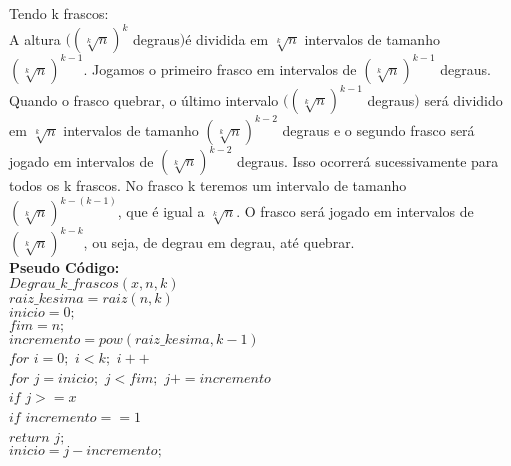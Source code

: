 \documentclass[10pt,a4paper]{article}
\begin{document}
Tendo k frascos:\\

 \hspace{1cm} A altura $((\sqrt[k]{n})^{k}$ degraus$)$é dividida em $\sqrt[k]{n}$ intervalos de tamanho $(\sqrt[k]{n})^{k-1}$. Jogamos o primeiro frasco em intervalos de $(\sqrt[k]{n})^{k-1}$ degraus. Quando o frasco quebrar, o último intervalo $((\sqrt[k]{n})^{k-1}$ degraus$)$ será dividido em $\sqrt[k]{n}$ intervalos de tamanho $(\sqrt[k]{n})^{k-2}$ degraus e o segundo frasco será jogado em intervalos de $(\sqrt[k]{n})^{k-2}$ degraus. Isso ocorrerá sucessivamente para todos os k frascos. No frasco k teremos um intervalo de tamanho $(\sqrt[k]{n})^{k-(k-1)}$, que é igual a $\sqrt[k]{n}$. O frasco será jogado em intervalos de $(\sqrt[k]{n})^{k-k}$, ou seja, de degrau em degrau, até quebrar.\\ 

 
\textbf{Pseudo Código: }\\


	$Degrau\_k\_frascos(x,n,k)$\\
	
	\hspace{1cm}$raiz\_kesima = raiz(n,k)$\\
	
	\hspace{1cm}$inicio = 0;$\\
	
	\hspace{1cm}$fim = n;$\\
	
	\hspace{1cm}$incremento = pow(raiz\_kesima,k-1)$\\
	
	\hspace{1cm}$for$ $i=0;$ $i < k;$ $i++$\\
	
	\hspace{2cm}$for$ $j = inicio;$ $j < fim;$ $j+= incremento$\\
	
	\hspace{3cm}$if$ $j >= x$\\
	
	\hspace{4cm}$if$ $incremento == 1$\\
	
	\hspace{5cm}$return$ $j;$\\
	
	\hspace{4cm}$inicio = j - incremento ;$\\
	
\end{document}
